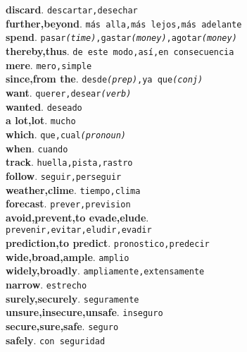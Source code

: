 \documentclass[twocolumn]{article}
\begin{document}
	\textsf{\textbf{discard}}. \texttt{descartar,desechar}\\
	\textsf{\textbf{further,beyond}}. \texttt{m\'as alla,m\'as lejos,m\'as adelante}\\
	\textsf{\textbf{spend}}. \texttt{pasar{\scriptsize \textsl{(time)}},gastar{\scriptsize \textsl{(money)}},agotar{\scriptsize \textsl{(money)}}}\\
	\textsf{\textbf{thereby,thus}}. \texttt{de este modo,as\'i,en consecuencia}\\
	\textsf{\textbf{mere}}. \texttt{mero,simple}\\
	\textsf{\textbf{since,from the}}. \texttt{desde{\scriptsize \textsl{(prep)}},ya que{\scriptsize \textsl{(conj)}}}\\
	\textsf{\textbf{want}}. \texttt{querer,desear{\scriptsize \textsl{(verb)}}}\\
	\textsf{\textbf{wanted}}. \texttt{deseado}\\
	\textsf{\textbf{a lot,lot}}. \texttt{mucho}\\
	\textsf{\textbf{which}}. \texttt{que,cual{\scriptsize \textsl{(pronoun)}}}\\
	\textsf{\textbf{when}}. \texttt{cuando}\\
	\textsf{\textbf{track}}. \texttt{huella,pista,rastro}\\
	\textsf{\textbf{follow}}. \texttt{seguir,perseguir}\\
	\textsf{\textbf{weather,clime}}. \texttt{tiempo,clima}\\
	\textsf{\textbf{forecast}}. \texttt{prever,prevision}\\
	\textsf{\textbf{avoid,prevent,to evade,elude}}.\\\texttt{prevenir,evitar,eludir,evadir}\\
	\textsf{\textbf{prediction,to predict}}. \texttt{pronostico,predecir}\\
	\textsf{\textbf{wide,broad,ample}}. \texttt{amplio}\\
	\textsf{\textbf{widely,broadly}}. \texttt{ampliamente,extensamente}\\
	\textsf{\textbf{narrow}}. \texttt{estrecho}\\
	\textsf{\textbf{surely,securely}}. \texttt{seguramente}\\
	\textsf{\textbf{unsure,insecure,unsafe}}. \texttt{inseguro}\\
	\textsf{\textbf{secure,sure,safe}}. \texttt{seguro}\\
	\textsf{\textbf{safely}}. \texttt{con seguridad}\\
\end{document}
